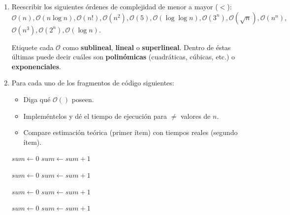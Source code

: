 \begin{enumerate}
	\item Reescribir los siguientes órdenes de complejidad de menor a mayor ($<$):\\
	$\mathcal{O}(n), \mathcal{O}(n\log n), \mathcal{O}(n!), \mathcal{O}(n^2), \mathcal{O}(5),
	\mathcal{O}(\log\log n), \mathcal{O}(3^n), \mathcal{O}(\sqrt{n}), \mathcal{O}(n^n),$ \\
	 $\mathcal{O}(n^3), \mathcal{O}(2^n), \mathcal{O}(\log n)$. 
	 
	 Etiquete cada $\mathcal{O}$ como
	 \textbf{sublineal}, \textbf{lineal} o \textbf{superlineal}. Dentro de éstas últimas puede
	 decir cuáles son \textbf{polinómicas} (cuadráticas, cúbicas, etc.) o \textbf{exponenciales}.
		
		
	\item Para cada uno de los fragmentos de código siguientes:
	\vspace{-3mm}
	\begin{itemize}
		\item Diga qué $ \mathcal{O}()$ poseen.
		\item Impleméntelos y dé el tiempo de ejecución para $\neq$ valores de $n$.
		\item Compare estimación teórica (primer ítem) con tiempos reales (segundo ítem).
	\end{itemize}
	
\newpage

\begin{minipage}[t]{7cm}
\null 
 \begin{algorithm}[H] %
\dontprintsemicolon
$sum \gets 0$\;
 {
	$sum \gets sum + 1$
}
\caption{{ } }
 \end{algorithm}
\end{minipage}%
\begin{minipage}[t]{7cm} %
\null
 \begin{algorithm}[H]
\dontprintsemicolon
$sum \gets 0$\;
 {
	 {
		$sum \gets sum + 1$
	}
}
\caption{{} } 
  \end{algorithm}
\end{minipage}


\vspace*{15mm}

\begin{minipage}[t]{7cm}
\null 
 \begin{algorithm}[H]
\dontprintsemicolon %
$sum \gets 0$\;
 {
	 {
		$sum \gets sum + 1$
	}
}
\caption{{} } 
  \end{algorithm}
\end{minipage}%
\begin{minipage}[t]{7cm}
\null
 \begin{algorithm}[H]
\dontprintsemicolon%
$sum \gets 0$\;
 {
	 {
		$sum \gets sum + 1$
	}
}
\caption{{} }
  \end{algorithm}
\end{minipage}



\end{enumerate}
